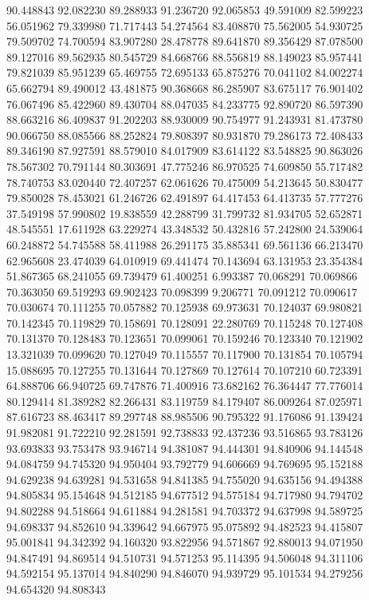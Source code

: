 90.448843
92.082230
89.288933
91.236720
92.065853
49.591009
82.599223
56.051962
79.339980
71.717443
54.274564
83.408870
75.562005
54.930725
79.509702
74.700594
83.907280
28.478778
89.641870
89.356429
87.078500
89.127016
89.562935
80.545729
84.668766
88.556819
88.149023
85.957441
79.821039
85.951239
65.469755
72.695133
65.875276
70.041102
84.002274
65.662794
89.490012
43.481875
90.368668
86.285907
83.675117
76.901402
76.067496
85.422960
89.430704
88.047035
84.233775
92.890720
86.597390
88.663216
86.409837
91.202203
88.930009
90.754977
91.243931
81.473780
90.066750
88.085566
88.252824
79.808397
80.931870
79.286173
72.408433
89.346190
87.927591
88.579010
84.017909
83.614122
83.548825
90.863026
78.567302
70.791144
80.303691
47.775246
86.970525
74.609850
55.717482
78.740753
83.020440
72.407257
62.061626
70.475009
54.213645
50.830477
79.850028
78.453021
61.246726
62.491897
64.417453
64.413735
57.777276
37.549198
57.990802
19.838559
42.288799
31.799732
81.934705
52.652871
48.545551
17.611928
63.229274
43.348532
50.432816
57.242800
24.539064
60.248872
54.745588
58.411988
26.291175
35.885341
69.561136
66.213470
62.965608
23.474039
64.010919
69.441474
70.143694
63.131953
23.354384
51.867365
68.241055
69.739479
61.400251
6.993387
70.068291
70.069866
70.363050
69.519293
69.902423
70.098399
9.206771
70.091212
70.090617
70.030674
70.111255
70.057882
70.125938
69.973631
70.124037
69.980821
70.142345
70.119829
70.158691
70.128091
22.280769
70.115248
70.127408
70.131370
70.128483
70.123651
70.099061
70.159246
70.123340
70.121902
13.321039
70.099620
70.127049
70.115557
70.117900
70.131854
70.105794
15.088695
70.127255
70.131644
70.127869
70.127614
70.107210
60.723391
64.888706
66.940725
69.747876
71.400916
73.682162
76.364447
77.776014
80.129414
81.389282
82.266431
83.119759
84.179407
86.009264
87.025971
87.616723
88.463417
89.297748
88.985506
90.795322
91.176086
91.139424
91.982081
91.722210
92.281591
92.738833
92.437236
93.516865
93.783126
93.693833
93.753478
93.946714
94.381087
94.444301
94.840906
94.144548
94.084759
94.745320
94.950404
93.792779
94.606669
94.769695
95.152188
94.629238
94.639281
94.531658
94.841385
94.755020
94.635156
94.494388
94.805834
95.154648
94.512185
94.677512
94.575184
94.717980
94.794702
94.802288
94.518664
94.611884
94.281581
94.703372
94.637998
94.589725
94.698337
94.852610
94.339642
94.667975
95.075892
94.482523
94.415807
95.001841
94.342392
94.160320
93.822956
94.571867
92.880013
94.071950
94.847491
94.869514
94.510731
94.571253
95.114395
94.506048
94.311106
94.592154
95.137014
94.840290
94.846070
94.939729
95.101534
94.279256
94.654320
94.808343
